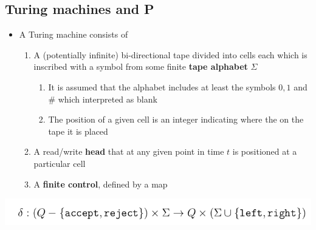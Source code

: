 \documentclass[11pt]{article}
\begin{document}
\subsection{Turing machines and P}
\label{sec:org55c4930}
\begin{itemize}
\item A Turing machine consists of
\begin{enumerate}
\item A (potentially infinite) bi-directional tape divided into cells each which is inscribed with a symbol from some finite \textbf{tape alphabet} \(\Sigma\)
\begin{enumerate}
\item It is assumed that the alphabet includes at least the symbols \(0,1\) and \# which interpreted as blank
\item The position of a given cell is an integer indicating where the on the tape it is placed
\end{enumerate}
\item A read/write \textbf{head} that at any given point in time \(t\) is positioned at a particular cell
\item A \textbf{finite control}, defined by a map
\end{enumerate}
\end{itemize}
\begin{center}
\includegraphics[width=.9\linewidth]{P, NP and NPC/screenshot_2019-03-17_19-40-13.png}
\end{center}
\end{document}
